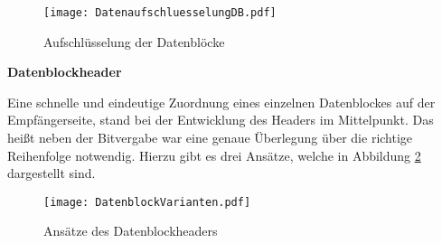\begin{figure}[H]
	\centering
	\texttt{[image: DatenaufschluesselungDB.pdf]}
	\caption{Aufschlüsselung der Datenblöcke}
  \label{fig:DatenaufschluesselungDB}
\end{figure}

\textbf{Datenblockheader}

Eine schnelle und eindeutige Zuordnung eines einzelnen Datenblockes auf der
Empfängerseite,  stand bei der Entwicklung des Headers im
Mittelpunkt.
Das heißt neben der Bitvergabe war eine genaue Überlegung über die richtige Reihenfolge
notwendig. Hierzu gibt es drei Ansätze, welche in Abbildung
\ref{fig:DatenblockVarianten} dargestellt sind.

\begin{figure}[H]
	\centering
	\texttt{[image: DatenblockVarianten.pdf]}
	\caption{Ansätze des Datenblockheaders}
  \label{fig:DatenblockVarianten}
\end{figure}

